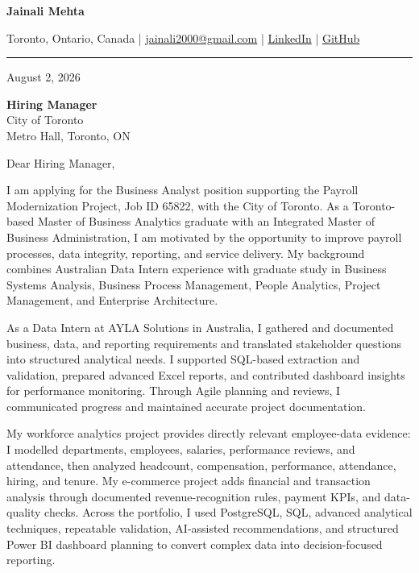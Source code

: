 \documentclass[letterpaper,10pt]{article}
\begin{document}
\begin{center}
  {\fontsize{17}{19}\selectfont\textbf{Jainali Mehta}}\par\vspace{2pt}
  \small Toronto, Ontario, Canada \;|\;
  \href{mailto:jainali2000@gmail.com}{jainali2000@gmail.com} \;|\;
  \href{https://www.linkedin.com/in/jainali-mehta}{LinkedIn} \;|\;
  \href{https://github.com/jainalimehta}{GitHub}
\end{center}
\vspace{-5pt}
\noindent\rule{\textwidth}{0.4pt}

August 2, 2026

\textbf{Hiring Manager}\\
City of Toronto\\
Metro Hall, Toronto, ON

Dear Hiring Manager,

I am applying for the Business Analyst position supporting the Payroll Modernization Project, Job ID 65822, with the City of Toronto. As a Toronto-based Master of Business Analytics graduate with an Integrated Master of Business Administration, I am motivated by the opportunity to improve payroll processes, data integrity, reporting, and service delivery. My background combines Australian Data Intern experience with graduate study in Business Systems Analysis, Business Process Management, People Analytics, Project Management, and Enterprise Architecture.

As a Data Intern at AYLA Solutions in Australia, I gathered and documented business, data, and reporting requirements and translated stakeholder questions into structured analytical needs. I supported SQL-based extraction and validation, prepared advanced Excel reports, and contributed dashboard insights for performance monitoring. Through Agile planning and reviews, I communicated progress and maintained accurate project documentation.

My workforce analytics project provides directly relevant employee-data evidence: I modelled departments, employees, salaries, performance reviews, and attendance, then analyzed headcount, compensation, performance, attendance, hiring, and tenure. My e-commerce project adds financial and transaction analysis through documented revenue-recognition rules, payment KPIs, and data-quality checks. Across the portfolio, I used PostgreSQL, SQL, advanced analytical techniques, repeatable validation, AI-assisted recommendations, and structured Power BI dashboard planning to convert complex data into decision-focused reporting.
\end{document}
